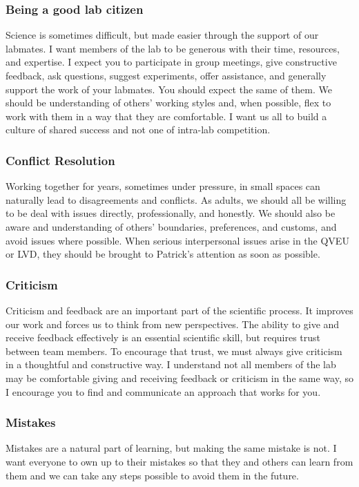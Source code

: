 \documentclass[10pt, letterpaper, twocolumn]{article} %
\begin{document}
\subsubsection{Being a good lab citizen}
Science is sometimes difficult, but made easier through the support of our labmates. I want members of the lab to be generous with their time, resources, and expertise. I expect you to participate in group meetings, give constructive feedback, ask questions, suggest experiments, offer assistance, and generally support the work of your labmates. You should expect the same of them. We should be understanding of others' working styles and, when possible, flex to work with them in a way that they are comfortable. I want us all to build a culture of shared success and not one of intra-lab competition.

\subsubsection{Conflict Resolution}
Working together for years, sometimes under pressure, in small spaces can naturally lead to disagreements and conflicts. As adults, we should all be willing to be deal with issues directly, professionally, and honestly. We should also be aware and understanding of others' boundaries, preferences, and customs, and avoid issues where possible. When serious interpersonal issues arise in the QVEU or LVD, they should be brought to Patrick's attention as soon as possible.

\subsubsection{Criticism}
Criticism and feedback are an important part of the scientific process. It improves our work and forces us to think from new perspectives. The ability to give and receive feedback effectively is an essential scientific skill, but requires trust between team members. To encourage that trust, we must always give criticism in a thoughtful and constructive way. I understand not all members of the lab may be comfortable giving and receiving feedback or criticism in the same way, so I encourage you to find and communicate an approach that works for you.

\subsubsection{Mistakes}
Mistakes are a natural part of learning, but making the same mistake is not. I want everyone to own up to their mistakes so that they and others can learn from them and we can take any steps possible to avoid them in the future.
\end{document}
